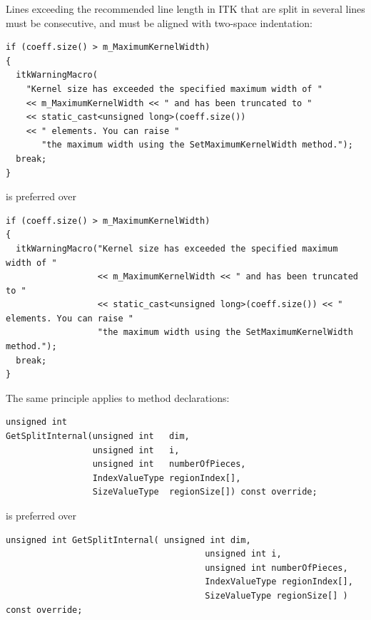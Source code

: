 Lines exceeding the recommended line length in ITK that are split in several
lines must be consecutive, and must be aligned with two-space indentation:

\small
\begin{verbatim}
if (coeff.size() > m_MaximumKernelWidth)
{
  itkWarningMacro(
    "Kernel size has exceeded the specified maximum width of "
    << m_MaximumKernelWidth << " and has been truncated to "
    << static_cast<unsigned long>(coeff.size())
    << " elements. You can raise "
       "the maximum width using the SetMaximumKernelWidth method.");
  break;
}
\end{verbatim}
\normalsize

is preferred over

\small
\begin{verbatim}
if (coeff.size() > m_MaximumKernelWidth)
{
  itkWarningMacro("Kernel size has exceeded the specified maximum width of "
                  << m_MaximumKernelWidth << " and has been truncated to "
                  << static_cast<unsigned long>(coeff.size()) << " elements. You can raise "
                  "the maximum width using the SetMaximumKernelWidth method.");
  break;
}
\end{verbatim}
\normalsize

The same principle applies to method declarations:

\small
\begin{verbatim}
unsigned int
GetSplitInternal(unsigned int   dim,
                 unsigned int   i,
                 unsigned int   numberOfPieces,
                 IndexValueType regionIndex[],
                 SizeValueType  regionSize[]) const override;
\end{verbatim}
\normalsize

is preferred over

\small
\begin{verbatim}
unsigned int GetSplitInternal( unsigned int dim,
                                       unsigned int i,
                                       unsigned int numberOfPieces,
                                       IndexValueType regionIndex[],
                                       SizeValueType regionSize[] ) const override;
\end{verbatim}
\normalsize


